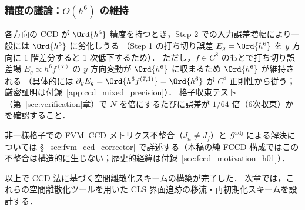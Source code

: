 \subsubsection{精度の議論：\texorpdfstring{$O(h^6)$}{O(h\textasciicircum 6)} の維持}

各方向の CCD が $\Ord{h^6}$ 精度を持つとき，Step 2 での入力誤差増幅により一般には $\Ord{h^5}$ に劣化しうる
（Step 1 の打ち切り誤差 $E_g = \Ord{h^6}$ を $y$ 方向に 1 階差分すると 1 次低下するため）．
ただし，$f \in C^8$ のもとで打ち切り誤差場 $E_g \propto h^6 f^{(7)}$ の $y$ 方向変動が $\Ord{h^6}$ に収まるため $\Ord{h^6}$ が維持される
（具体的には $\partial_y E_g = \Ord{h^6 f^{(7,1)}} = \Ord{h^6}$ が $C^8$ 正則性から従う；厳密証明は付録~\ref{app:ccd_mixed_precision}）．
格子収束テスト（第~\ref{sec:verification}章）で $N$ を倍にするたびに誤差が $1/64$ 倍（6次収束）かを確認すること．

\medskip

非一様格子での FVM--CCD メトリクス不整合（$J_n \neq J_f$）と $\mathcal{G}^\text{adj}$ による解決については §~\ref{sec:fvm_ccd_corrector} で詳述する（本稿の純 FCCD 構成ではこの不整合は構造的に生じない；歴史的経緯は付録~\ref{sec:fccd_motivation_h01}）．

以上で CCD 法に基づく空間離散化スキームの構築が完了した．
次章では，これらの空間離散化ツールを用いた CLS 界面追跡の移流・再初期化スキームを設計する．
